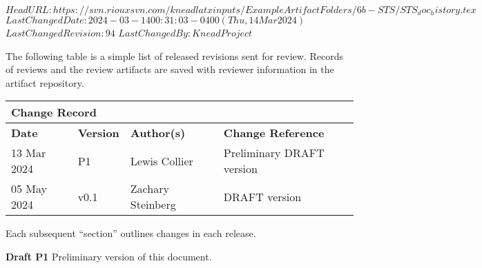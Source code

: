 \svnidlong
{$HeadURL: https://svn.riouxsvn.com/kneadlatxinputs/ExampleArtifactFolders/6b-STS/STS_doc_history.tex $}
{$LastChangedDate: 2024-03-14 00:31:03 -0400 (Thu, 14 Mar 2024) $}
{$LastChangedRevision: 94 $}
{$LastChangedBy: KneadProject $}

The following table is a simple list of released revisions sent for review.
Records of reviews and the review artifacts are saved with reviewer information in the \KNEADagencyName artifact repository.

\begin{table}[h]
	\centering 
		\begin{tabular}{|p{1.0in}|p{0.8in}|p{1.4in}|p{2.1in}|}
    \multicolumn{4}{l}{\bfseries Change Record} \\
		\hline
			{\bfseries Date}  &  {\bfseries Version} & {\bfseries Author(s)} & {\bfseries Change Reference} \\
		\hline
		\hline
			 13 Mar 2024	&	\centering	P1	&	{\raggedright Lewis Collier}	&	Preliminary DRAFT version  \\ \hline
			 05 May 2024	&	\centering	v0.1	&	{\raggedright Zachary Steinberg}	&	DRAFT version  \\ \hline
		\hline		
		\hline				
  	\end{tabular}
\end{table}

Each subsequent ``section'' outlines changes in each release.

{\bf Draft P1}
Preliminary version of this document.


